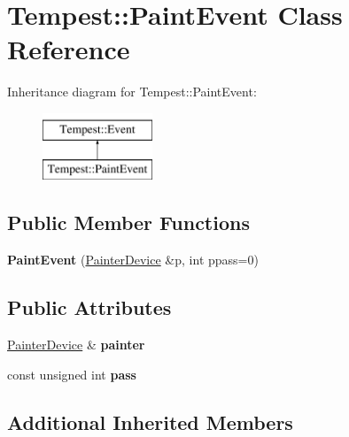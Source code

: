 \hypertarget{class_tempest_1_1_paint_event}{\section{Tempest\+:\+:Paint\+Event Class Reference}
\label{class_tempest_1_1_paint_event}
}
Inheritance diagram for Tempest\+:\+:Paint\+Event\+:\begin{figure}[H]
\begin{center}
\leavevmode
\includegraphics[height=2.000000cm]{class_tempest_1_1_paint_event}
\end{center}
\end{figure}
\subsection*{Public Member Functions}
\begin{DoxyCompactItemize}
\item 
\hypertarget{class_tempest_1_1_paint_event_a97acd4bf7c63dd9447f2b61abf4615dd}{{\bfseries Paint\+Event} (\hyperlink{class_tempest_1_1_painter_device}{Painter\+Device} \&p, int ppass=0)}\label{class_tempest_1_1_paint_event_a97acd4bf7c63dd9447f2b61abf4615dd}

\end{DoxyCompactItemize}
\subsection*{Public Attributes}
\begin{DoxyCompactItemize}
\item 
\hypertarget{class_tempest_1_1_paint_event_a598fef8c36da25703ffe537a87812b6b}{\hyperlink{class_tempest_1_1_painter_device}{Painter\+Device} \& {\bfseries painter}}\label{class_tempest_1_1_paint_event_a598fef8c36da25703ffe537a87812b6b}

\item 
\hypertarget{class_tempest_1_1_paint_event_ab9b613757e3924a4cd41f7e7e6549679}{const unsigned int {\bfseries pass}}\label{class_tempest_1_1_paint_event_ab9b613757e3924a4cd41f7e7e6549679}

\end{DoxyCompactItemize}
\subsection*{Additional Inherited Members}


